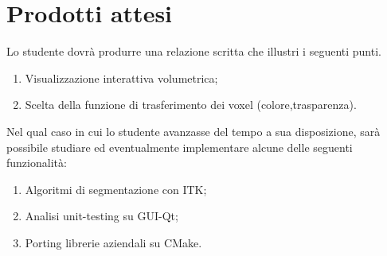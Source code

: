 \section*{Prodotti attesi}
Lo studente dovrà produrre una relazione scritta che illustri i seguenti punti.
\begin{enumerate}
    \item Visualizzazione interattiva volumetrica;
    
    \item Scelta della funzione di trasferimento dei voxel (colore,trasparenza).
\end{enumerate}

Nel qual caso in cui lo studente avanzasse del tempo a sua disposizione, sarà possibile studiare ed eventualmente implementare alcune delle seguenti funzionalità:
\begin{enumerate}
    \item Algoritmi di segmentazione con ITK;
    
    \item Analisi unit-testing su GUI-Qt;
    
    \item Porting librerie aziendali su CMake.
\end{enumerate}
